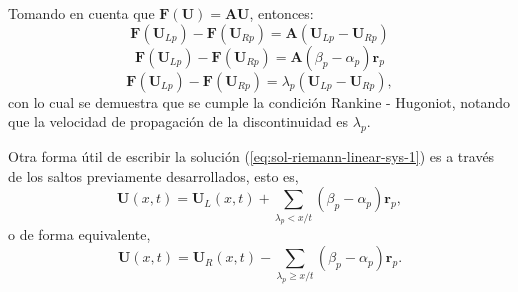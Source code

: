 Tomando en cuenta que $\mathbf{F}(\mathbf{U}) = \mathbf{A}\mathbf{U}$, entonces:
\begin{equation}
 	\mathbf{F}(\mathbf{U}_{Lp}) - \mathbf{F}(\mathbf{U}_{Rp}) = \mathbf{A}(\mathbf{U}_{Lp} - \mathbf{U}_{Rp})
\end{equation}
\begin{equation}
	\mathbf{F}(\mathbf{U}_{Lp}) - \mathbf{F}(\mathbf{U}_{Rp}) = \mathbf{A}(\beta_{p} - \alpha_{p})\mathbf{r}_p
\end{equation}
\begin{equation}
	\mathbf{F}(\mathbf{U}_{Lp}) - \mathbf{F}(\mathbf{U}_{Rp}) = \lambda_{p}(\mathbf{U}_{Lp} - \mathbf{U}_{Rp}),
\end{equation}
con lo cual se demuestra que se cumple la condición Rankine - Hugoniot, notando que la velocidad de propagación de la discontinuidad es $\lambda_p$.

Otra forma útil de escribir la solución (\ref{eq:sol-riemann-linear-sys-1}) es a través de los saltos previamente desarrollados, esto es,
\begin{equation}
	\mathbf{U}(x,t) = \mathbf{U}_{L}(x,t) + \sum_{\lambda_{p} < x/t} (\beta_{p} - \alpha_{p}) \mathbf{r}_{p},
\end{equation}
o de forma equivalente,
\begin{equation}
	\mathbf{U}(x,t) = \mathbf{U}_{R}(x,t) - \sum_{\lambda_{p} \geq x/t} (\beta_{p} - \alpha_{p}) \mathbf{r}_{p}.
\end{equation}